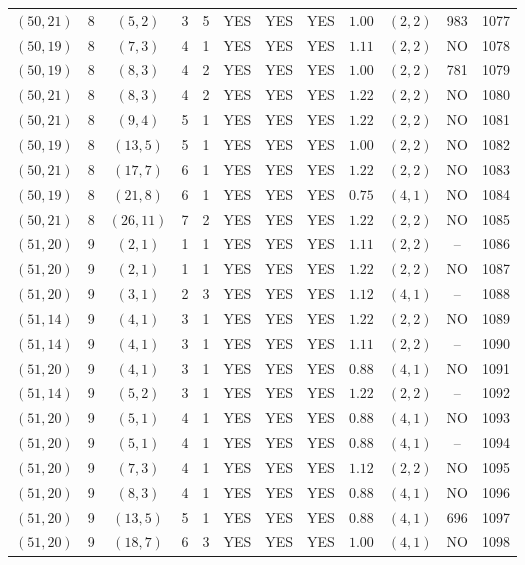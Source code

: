 \begin{longtable}{|c|c|c|c|c|c|c|c|c|c|c|c|}
$(50,21)$ & 8 & $(5,2)$ & 3 & 5 & YES & YES & YES & $1.00$ & $(2,2)$ & 983 & 1077\\
$(50,19)$ & 8 & $(7,3)$ & 4 & 1 & YES & YES & YES & $1.11$ & $(2,2)$ & NO & 1078\\
$(50,19)$ & 8 & $(8,3)$ & 4 & 2 & YES & YES & YES & $1.00$ & $(2,2)$ & 781 & 1079\\
$(50,21)$ & 8 & $(8,3)$ & 4 & 2 & YES & YES & YES & $1.22$ & $(2,2)$ & NO & 1080\\
$(50,21)$ & 8 & $(9,4)$ & 5 & 1 & YES & YES & YES & $1.22$ & $(2,2)$ & NO & 1081\\
$(50,19)$ & 8 & $(13,5)$ & 5 & 1 & YES & YES & YES & $1.00$ & $(2,2)$ & NO & 1082\\
$(50,21)$ & 8 & $(17,7)$ & 6 & 1 & YES & YES & YES & $1.22$ & $(2,2)$ & NO & 1083\\
$(50,19)$ & 8 & $(21,8)$ & 6 & 1 & YES & YES & YES & $0.75$ & $(4,1)$ & NO & 1084\\
$(50,21)$ & 8 & $(26,11)$ & 7 & 2 & YES & YES & YES & $1.22$ & $(2,2)$ & NO & 1085\\
$(51,20)$ & 9 & $(2,1)$ & 1 & 1 & YES & YES & YES & $1.11$ & $(2,2)$ & -- & 1086\\
$(51,20)$ & 9 & $(2,1)$ & 1 & 1 & YES & YES & YES & $1.22$ & $(2,2)$ & NO & 1087\\
$(51,20)$ & 9 & $(3,1)$ & 2 & 3 & YES & YES & YES & $1.12$ & $(4,1)$ & -- & 1088\\
$(51,14)$ & 9 & $(4,1)$ & 3 & 1 & YES & YES & YES & $1.22$ & $(2,2)$ & NO & 1089\\
$(51,14)$ & 9 & $(4,1)$ & 3 & 1 & YES & YES & YES & $1.11$ & $(2,2)$ & -- & 1090\\
$(51,20)$ & 9 & $(4,1)$ & 3 & 1 & YES & YES & YES & $0.88$ & $(4,1)$ & NO & 1091\\
$(51,14)$ & 9 & $(5,2)$ & 3 & 1 & YES & YES & YES & $1.22$ & $(2,2)$ & -- & 1092\\
$(51,20)$ & 9 & $(5,1)$ & 4 & 1 & YES & YES & YES & $0.88$ & $(4,1)$ & NO & 1093\\
$(51,20)$ & 9 & $(5,1)$ & 4 & 1 & YES & YES & YES & $0.88$ & $(4,1)$ & -- & 1094\\
$(51,20)$ & 9 & $(7,3)$ & 4 & 1 & YES & YES & YES & $1.12$ & $(2,2)$ & NO & 1095\\
$(51,20)$ & 9 & $(8,3)$ & 4 & 1 & YES & YES & YES & $0.88$ & $(4,1)$ & NO & 1096\\
$(51,20)$ & 9 & $(13,5)$ & 5 & 1 & YES & YES & YES & $0.88$ & $(4,1)$ & 696 & 1097\\
$(51,20)$ & 9 & $(18,7)$ & 6 & 3 & YES & YES & YES & $1.00$ & $(4,1)$ & NO & 1098\\

\end{longtable}
